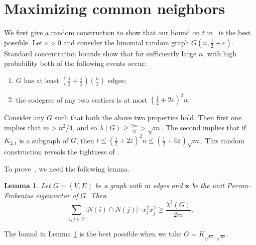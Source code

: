 \documentclass[11pt,a4paper]{article}
\newtheorem{lemma}[theorem]{Lemma}
\theoremstyle{definition}
\theoremstyle{remark}
\begin{document}
\section{Maximizing common neighbors}

\label{sec:common}

We first give a random construction to show that our bound on $t$ in~ is the best possible. Let $\varepsilon>0$ and consider the binomial random graph $G(n, \frac{1}{2} + \varepsilon)$. 
Standard concentration bounds show that for sufficiently large $n$, with high probability both of the following events occur:
\begin{enumerate}
    \item $G$ has at least $(\frac{1}{2} + \frac{\varepsilon}{2}) \binom{n}{2}$ edges;
    \item the codegree of any two vertices is at most $(\frac{1}{2} + 2\varepsilon)^2 n$.
\end{enumerate}
Consider any $G$ such that both the above two properties hold. Then first one implies that $m > n^2 / 4$, and so $\lambda(G) \geq \frac{2m}{n} > \sqrt{m}$. The second implies that if $K_{2, t}$ is a subgraph of $G$, then $t \leq (\frac{1}{2} + 2\varepsilon)^2 n \leq \left(\frac{1}{2} + 6\varepsilon\right) \sqrt{m}$. This random construction reveals the tightness of . 

\medskip 
To prove~, we need the following lemma.  

\begin{lemma} \label{lem-lower-bound}
    Let $G=(V,E)$ be a graph with $m$ edges and 
    $\bm{x}$ be the unit Perron--Frobenius eigenvector of $G$. Then 
    $$\sum_{i,j\in V} |N(i)\cap N(j)|\cdot x_i^2 x_j^2 \geq \frac{\lambda^3(G)}{2m}.$$
\end{lemma}

The bound in Lemma \ref{lem-lower-bound} 
is the best possible when we take $G=K_{\sqrt{m},\sqrt{m}}$. 
\end{document}
